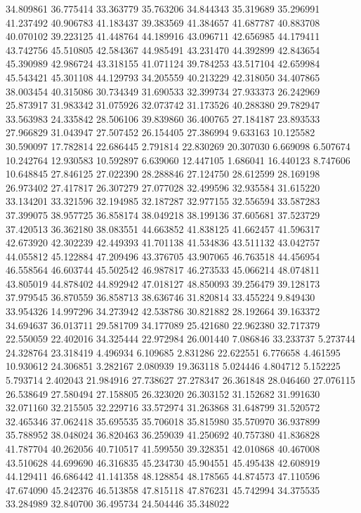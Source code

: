 34.809861
36.775414
33.363779
35.763206
34.844343
35.319689
35.296991
41.237492
40.906783
41.183437
39.383569
41.384657
41.687787
40.883708
40.070102
39.223125
41.448764
44.189916
43.096711
42.656985
44.179411
43.742756
45.510805
42.584367
44.985491
43.231470
44.392899
42.843654
45.390989
42.986724
43.318155
41.071124
39.784253
43.517104
42.659984
45.543421
45.301108
44.129793
34.205559
40.213229
42.318050
34.407865
38.003454
40.315086
30.734349
31.690533
32.399734
27.933373
26.242969
25.873917
31.983342
31.075926
32.073742
31.173526
40.288380
29.782947
33.563983
24.335842
28.506106
39.839860
36.400765
27.184187
23.893533
27.966829
31.043947
27.507452
26.154405
27.386994
9.633163
10.125582
30.590097
17.782814
22.686445
2.791814
22.830269
20.307030
6.669098
6.507674
10.242764
12.930583
10.592897
6.639060
12.447105
1.686041
16.440123
8.747606
10.648845
27.846125
27.022390
28.288846
27.124750
28.612599
28.169198
26.973402
27.417817
26.307279
27.077028
32.499596
32.935584
31.615220
33.134201
33.321596
32.194985
32.187287
32.977155
32.556594
33.587283
37.399075
38.957725
36.858174
38.049218
38.199136
37.605681
37.523729
37.420513
36.362180
38.083551
44.663852
41.838125
41.662457
41.596317
42.673920
42.302239
42.449393
41.701138
41.534836
43.511132
43.042757
44.055812
45.122884
47.209496
43.376705
43.907065
46.763518
44.456954
46.558564
46.603744
45.502542
46.987817
46.273533
45.066214
48.074811
43.805019
44.878402
44.892942
47.018127
48.850093
39.256479
39.128173
37.979545
36.870559
36.858713
38.636746
31.820814
33.455224
9.849430
33.954326
14.997296
34.273942
42.538786
30.821882
28.192664
39.163372
34.694637
36.013711
29.581709
34.177089
25.421680
22.962380
32.717379
22.550059
22.402016
34.325444
22.972984
26.001440
7.086846
33.233737
5.273744
24.328764
23.318419
4.496934
6.109685
2.831286
22.622551
6.776658
4.461595
10.930612
24.306851
3.282167
2.080939
19.363118
5.024446
4.804712
5.152225
5.793714
2.402043
21.984916
27.738627
27.278347
26.361848
28.046460
27.076115
26.538649
27.580494
27.158805
26.323020
26.303152
31.152682
31.991630
32.071160
32.215505
32.229716
33.572974
31.263868
31.648799
31.520572
32.465346
37.062418
35.695535
35.706018
35.815980
35.570970
36.937899
35.788952
38.048024
36.820463
36.259039
41.250692
40.757380
41.836828
41.787704
40.262056
40.710517
41.599550
39.328351
42.010868
40.467008
43.510628
44.699690
46.316835
45.234730
45.904551
45.495438
42.608919
44.129411
46.686442
41.141358
48.128854
48.178565
44.874573
47.110596
47.674090
45.242376
46.513858
47.815118
47.876231
45.742994
34.375535
33.284989
32.840700
36.495734
24.504446
35.348022
